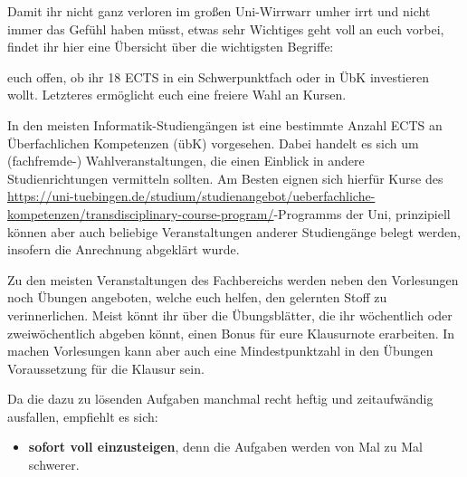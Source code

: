 Damit ihr nicht ganz verloren im gro\ss en Uni-Wirrwarr umher irrt und
  nicht immer das Gefühl haben müsst, etwas sehr Wichtiges geht
  voll an euch vorbei, findet ihr hier eine Übersicht über die wichtigsten Begriffe:

\begin{description}



  euch offen, ob ihr 18 ECTS in ein Schwerpunktfach oder in ÜbK
  investieren wollt. Letzteres ermöglicht euch eine freiere Wahl an Kursen.
  
\item [übK:] In den meisten Informatik-Studiengängen ist eine bestimmte Anzahl ECTS an Überfachlichen Kompetenzen (übK) vorgesehen. Dabei handelt es sich um (fachfremde-) Wahlveranstaltungen, die einen Einblick in andere Studienrichtungen vermitteln sollten. Am Besten eignen sich hierfür Kurse des \href{TRACS}{https://uni-tuebingen.de/studium/studienangebot/ueberfachliche-kompetenzen/transdisciplinary-course-program/}-Programms der Uni, prinzipiell können aber auch beliebige Veranstaltungen anderer Studiengänge belegt werden, insofern die Anrechnung abgeklärt wurde.

\item [Übungen:] Zu den meisten Veranstaltungen des Fachbereichs werden neben den Vorlesungen noch Übungen angeboten, welche euch helfen, den gelernten Stoff zu verinnerlichen. Meist könnt ihr über die Übungsblätter, die ihr wöchentlich oder zweiwöchentlich abgeben könnt, einen Bonus für eure Klausurnote erarbeiten. In machen Vorlesungen kann aber auch eine Mindestpunktzahl in den Übungen Voraussetzung für die Klausur sein.

Da die dazu zu lösenden Aufgaben manchmal recht heftig und zeitaufwändig ausfallen, empfiehlt es sich:

\begin{itemize}

\item \textbf{sofort voll einzusteigen}, denn die Aufgaben werden von Mal
  zu Mal schwerer.


\end{itemize}
\end{description}
